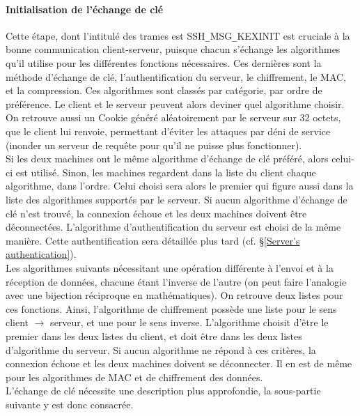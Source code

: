 \paragraph{Initialisation de l'échange de clé} \label{KEXINIT}
Cette étape, dont l'intitulé des trames est {\ttfamily SSH\verb|_|MSG\verb|_|KEXINIT} est cruciale à la bonne communication client-serveur, puisque chacun s'échange les algorithmes qu'il utilise pour les différentes fonctions nécessaires. Ces dernières sont la méthode d'échange de clé, l'authentification du serveur, le chiffrement, le MAC, et la compression. Ces algorithmes sont classés par catégorie, par ordre de préférence. Le client et le serveur peuvent alors deviner quel algorithme choisir. On retrouve aussi un Cookie généré aléatoirement par le serveur sur 32 octets, que le client lui renvoie, permettant d'éviter les attaques par déni de service (inonder un serveur de requête pour qu'il ne puisse plus fonctionner). \cite{hajjeh_ibrahim_protocole_2006,cadegros_etude_2023} \\

Si les deux machines ont le même algorithme d'échange de clé préféré, alors celui-ci est utilisé. Sinon, les machines regardent dans la liste du client chaque algorithme, dans l'ordre. Celui choisi sera alors le premier qui figure aussi dans la liste des algorithmes supportés par le serveur. Si aucun algorithme d'échange de clé n'est trouvé, la connexion échoue et les deux machines doivent être déconnectées.
L'algorithme d'authentification du serveur est choisi de la même manière. Cette authentification sera détaillée plus tard (cf. §\ref{Server's authentication}). \cite{lonvick_secure_2006} \\

Les algorithmes suivants nécessitant une opération différente à l'envoi et à la réception de données, chacune étant l'inverse de l'autre (on peut faire l'analogie avec une bijection réciproque en mathématiques). On retrouve deux listes pour ces fonctions. Ainsi, l'algorithme de chiffrement possède une liste pour le sens client $\rightarrow$ serveur, et une pour le sens inverse. L'algorithme choisit d'être le premier dans les deux listes du client, et doit être dans les deux listes d'algorithme du serveur. Si aucun algorithme ne répond à ces critères, la connexion échoue et les deux machines doivent se déconnecter.
Il en est de même pour les algorithmes de MAC et de chiffrement des données. \cite{lonvick_secure_2006} \\

L'échange de clé nécessite une description plus approfondie, la sous-partie suivante y est donc consacrée.